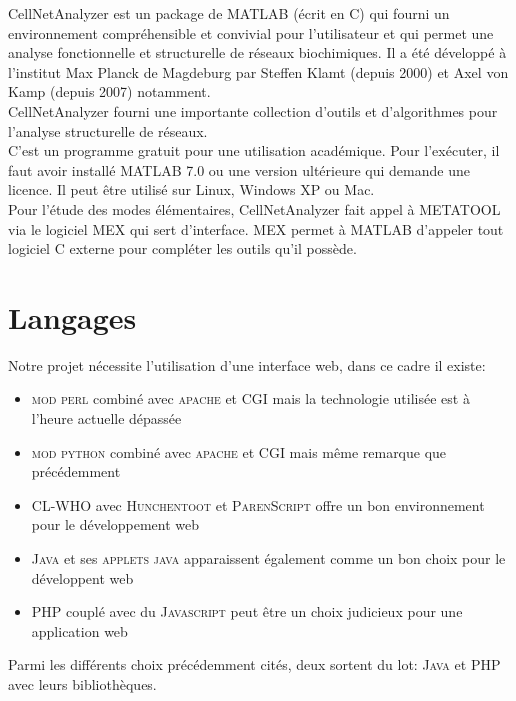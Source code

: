 CellNetAnalyzer est un package de MATLAB (écrit en \textsc{C}) qui fourni un environnement compréhensible et convivial pour l'utilisateur et qui permet une analyse fonctionnelle et structurelle de réseaux biochimiques. Il a été développé à l'institut Max Planck de Magdeburg par Steffen Klamt (depuis 2000) et Axel von Kamp (depuis 2007) notamment.\\
CellNetAnalyzer fourni une importante collection d'outils et d'algorithmes pour l'analyse structurelle de réseaux.\\
C'est un programme gratuit pour une utilisation académique. Pour l'exécuter, il faut avoir installé MATLAB 7.0 ou une version ultérieure qui demande une licence. Il peut être utilisé sur Linux, Windows XP ou Mac.\\
Pour l'étude des modes élémentaires, CellNetAnalyzer fait appel à METATOOL via le logiciel MEX qui sert d'interface. MEX permet à MATLAB d'appeler tout logiciel \textsc{C} externe pour compléter les outils qu'il possède.

\section{Langages}

Notre projet nécessite l'utilisation d'une interface web, dans ce cadre il existe:
\begin{itemize}
\item \textsc{mod perl} combiné avec \textsc{apache} et \textsc{CGI} mais la technologie utilisée est à l'heure actuelle dépassée
\item \textsc{mod python} combiné avec \textsc{apache} et \textsc{CGI} mais même remarque que précédemment
\item \textsc{CL-WHO} avec \textsc{Hunchentoot} et \textsc{ParenScript} offre un bon environnement pour le développement web
\item \textsc{Java} et ses \textsc{applets java} apparaissent également comme un bon choix pour le développent web
\item \textsc{PHP} couplé avec du \textsc{Javascript} peut être un choix judicieux pour une application web\\
\end{itemize}

Parmi les différents choix précédemment cités, deux sortent du lot: \textsc{Java} et \textsc{PHP} avec leurs bibliothèques.